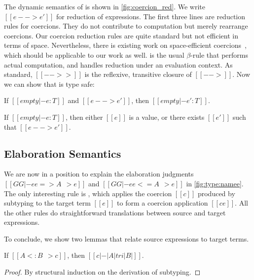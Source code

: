 The dynamic semantics of \tname is shown in \cref{fig:coercion_red}. We write
$[[e --> e']]$ for reduction of expressions. The first three lines are reduction
rules for coercions. They do not contribute to computation but merely rearrange
coercions. Our coercion reduction rules are quite standard but not efficient in
terms of space. Nevertheless, there is existing work on space-efficient
coercions~\citep{Siek_2015, herman2010space}, which should be applicable to our
work as well.  is the usual $\beta$-rule that performs actual
computation, and  handles reduction under an evaluation context. As
standard, $[[-->>]]$ is the reflexive, transitive closure of $[[-->]]$.
Now we can show that \tname is type safe:

\begin{theorem} \label{thm:target_preserve}
  If $[[empty |- e : T]]$ and $[[e --> e']]$, then $[[empty |- e' : T]]$.
\end{theorem}

\begin{theorem} \label{thm:target_progress}
  If $[[empty |- e : T]]$, then either $[[e]]$ is a value, or there exists $[[e']]$ such
  that $[[e --> e']]$.
\end{theorem}


\subsection{Elaboration Semantics}


We are now in a position to explain the elaboration judgments $[[GG |- ee => A ~~> e]]$
and $[[GG |- ee <= A ~~> e]]$ in \cref{fig:type:namee}. The only
interesting rule is , which applies the coercion $[[c]]$ produced by
subtyping to the target term $[[e]]$ to form a coercion application
$[[c e]]$. All the other rules do straightforward translations between
source and target expressions.


To conclude, we show two lemmas that relate source expressions to target terms.

\begin{lemma}   \label{lemma:sub-correct}
  If $[[A <: B ~~> c]]$, then $[[c |-  |A| tri |B|]]$.
\end{lemma}
\begin{proof}
  By structural induction on the derivation of subtyping.
\end{proof}


